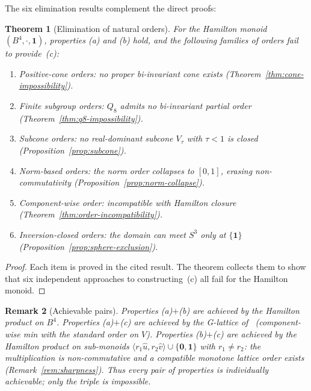 \documentclass[11pt,a4paper]{article}
\newtheorem{theorem}{Theorem}
\newtheorem{remark}[theorem]{Remark}
\begin{document}
The six elimination results complement the direct proofs:

\begin{theorem}[Elimination of natural orders]
\label{thm:elimination}
For the Hamilton monoid $(B^4, \cdot, \mathbf{1})$, properties
(a) and (b) hold, and the following families of orders fail to
provide~(c):
\begin{enumerate}[nosep]
\item Positive-cone orders: no proper bi-invariant cone exists
  (Theorem~\ref{thm:cone-impossibility}).
\item Finite subgroup orders: $Q_8$ admits no bi-invariant partial
  order (Theorem~\ref{thm:q8-impossibility}).
\item Subcone orders: no real-dominant subcone $V_\tau$ with
  $\tau < 1$ is closed (Proposition~\ref{prop:subcone}).
\item Norm-based orders: the norm order collapses to $[0,1]$, erasing
  non-commutativity (Proposition~\ref{prop:norm-collapse}).
\item Component-wise order: incompatible with Hamilton closure
  (Theorem~\ref{thm:order-incompatibility}).
\item Inversion-closed orders: the domain can meet $S^3$ only at
  $\{\mathbf{1}\}$ (Proposition~\ref{prop:sphere-exclusion}).
\end{enumerate}
\end{theorem}

\begin{proof}
Each item is proved in the cited result. The theorem collects them
to show that six independent approaches to constructing~(c) all fail
for the Hamilton monoid.
\end{proof}

\begin{remark}[Achievable pairs]
\label{rem:pairs}
Properties (a)$+$(b) are achieved by the Hamilton product on $B^4$.
Properties (a)$+$(c) are achieved by the G-lattice of~\citet{p11}
(component-wise min with the standard order on $V$). Properties
(b)$+$(c) are achieved by the Hamilton product on sub-monoids
$\langle r_1 \hat{u}, r_2 \hat{v}\rangle \cup \{\mathbf{0},
\mathbf{1}\}$ with $r_1 \neq r_2$: the multiplication is
non-commutative and a compatible monotone lattice order exists
(Remark~\ref{rem:sharpness}). Thus every pair of properties is
individually achievable; only the triple is impossible.
\end{remark}
\end{document}
